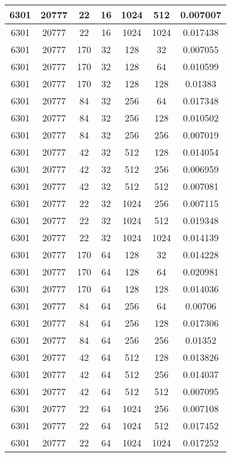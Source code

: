 \documentclass[9pt]{article}
\begin{document}
\begin{tabular}{|c|c|c|c|c|c|c| }
\hline
6301  & 20777  & 22  & 16  & 1024  & 512  & 0.007007 \\
\hline
6301  & 20777  & 22  & 16  & 1024  & 1024  & 0.017438 \\
\hline
6301  & 20777  & 170  & 32  & 128  & 32  & 0.007055 \\
\hline
6301  & 20777  & 170  & 32  & 128  & 64  & 0.010599 \\
\hline
6301  & 20777  & 170  & 32  & 128  & 128  & 0.01383 \\
\hline
6301  & 20777  & 84  & 32  & 256  & 64  & 0.017348 \\
\hline
6301  & 20777  & 84  & 32  & 256  & 128  & 0.010502 \\
\hline
6301  & 20777  & 84  & 32  & 256  & 256  & 0.007019 \\
\hline
6301  & 20777  & 42  & 32  & 512  & 128  & 0.014054 \\
\hline
6301  & 20777  & 42  & 32  & 512  & 256  & 0.006959 \\
\hline
6301  & 20777  & 42  & 32  & 512  & 512  & 0.007081 \\
\hline
6301  & 20777  & 22  & 32  & 1024  & 256  & 0.007115 \\
\hline
6301  & 20777  & 22  & 32  & 1024  & 512  & 0.019348 \\
\hline
6301  & 20777  & 22  & 32  & 1024  & 1024  & 0.014139 \\
\hline
6301  & 20777  & 170  & 64  & 128  & 32  & 0.014228 \\
\hline
6301  & 20777  & 170  & 64  & 128  & 64  & 0.020981 \\
\hline
6301  & 20777  & 170  & 64  & 128  & 128  & 0.014036 \\
\hline
6301  & 20777  & 84  & 64  & 256  & 64  & 0.00706 \\
\hline
6301  & 20777  & 84  & 64  & 256  & 128  & 0.017306 \\
\hline
6301  & 20777  & 84  & 64  & 256  & 256  & 0.01352 \\
\hline
6301  & 20777  & 42  & 64  & 512  & 128  & 0.013826 \\
\hline
6301  & 20777  & 42  & 64  & 512  & 256  & 0.014037 \\
\hline
6301  & 20777  & 42  & 64  & 512  & 512  & 0.007095 \\
\hline
6301  & 20777  & 22  & 64  & 1024  & 256  & 0.007108 \\
\hline
6301  & 20777  & 22  & 64  & 1024  & 512  & 0.017452 \\
\hline
6301  & 20777  & 22  & 64  & 1024  & 1024  & 0.017252 \\

\end{tabular}
\end{document}
